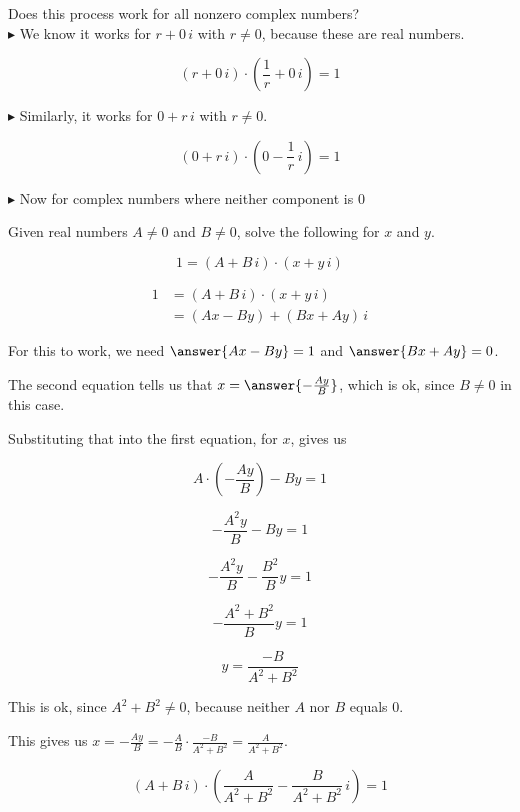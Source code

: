 \documentclass{ximera}
\begin{document}
Does this process work for all nonzero complex numbers? \\


$\blacktriangleright$  We know it works for $r + 0 \, i$ with $r \ne 0$, because these are real numbers.


\[   (r + 0 \, i) \cdot \left(\frac{1}{r} + 0 \, i \right) = 1        \]







$\blacktriangleright$  Similarly, it works for $0 + r \, i$ with $r \ne 0$.


\[   (0 + r \, i) \cdot \left(0 - \frac{1}{r} \, i \right) = 1        \]





$\blacktriangleright$ Now for complex numbers where neither component is $0$


\begin{explanation}


Given real numbers $A \ne 0$ and $B \ne 0$, solve the following for $x$ and $y$.


\[       1 = (A + B \, i) \cdot (x + y \, i)            \]



\begin{align*}
1          & = (A + B \, i) \cdot (x + y \, i)      \\
           & = (Ax-By) + (Bx+Ay) \, i
\end{align*}


For this to work, we need $\answer{A x - B y} = 1$ and $\answer{B x + A y} = 0$.



The second equation tells us that $x = \answer{-\frac{A y}{B}}$, which is ok, since $B \ne 0$ in this case.

Substituting that into the first equation, for $x$, gives us


\[   A \cdot \left(-\frac{A y}{B}\right) - B y = 1     \]


\[   -\frac{A^2 y}{B} - B y = 1     \]

\[   -\frac{A^2 y}{B} - \frac{B^2}{B} y = 1     \]


\[   -\frac{A^2 + B^2}{B} y = 1     \]


\[  y = \frac{-B}{A^2 + B^2}     \]

This is ok, since $A^2 + B^2 \ne 0$, because neither $A$ nor $B$ equals $0$.



This gives us $x = -\frac{A y}{B} = -\frac{A}{B} \cdot \frac{-B}{A^2 + B^2} = \frac{A}{A^2 + B^2} $.







\[       (A + B \, i) \cdot \left( \frac{A}{A^2 + B^2} - \frac{B}{A^2 + B^2} \, i \right) = 1            \]



\end{explanation}
\end{document}
